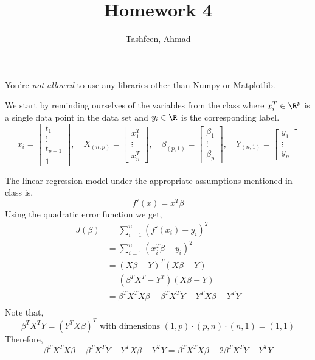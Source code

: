\documentclass{homework}
\author{Tashfeen, Ahmad}
\title{Homework 4}
\begin{document}
 \maketitle
You're \textit{not allowed} to use any libraries other than Numpy or Matplotlib.

We start by reminding ourselves of the variables from the class where $x_i^T \in \R^p$ is a single data point in the data set and $y_i\in \R$ is the corresponding label.
\[
  x_i =
  \begin{bmatrix}
    t_1 \\ \vdots \\ t_{p-1} \\ 1
  \end{bmatrix},
  \quad
  X_{(n, p)} =
  \begin{bmatrix}
    x^T_1 \\ \vdots \\ x^T_n
  \end{bmatrix},
  \quad
  \beta_{(p, 1)} =
  \begin{bmatrix}
    \beta_1 \\ \vdots \\ \beta_p
  \end{bmatrix},
  \quad
  Y_{(n, 1)} =
  \begin{bmatrix}
    y_1 \\ \vdots \\ y_n
  \end{bmatrix}
\]

The linear regression model under the appropriate assumptions mentioned in class is,
\[
  f'(x) = x^T\beta
\]
Using the quadratic error function we get,
\begin{align*}
  J(\beta) & = \sum_{i=1}^n(f'(x_i) - y_{i})^2 \\
           & = \sum_{i=1}^n(x_i^T\beta - y_{i})^2 \\
           & = (X\beta - Y)^T(X\beta - Y) \\
           & = (\beta^TX^T - Y^T)(X\beta - Y) \\
           & = \beta^TX^TX\beta - \beta^TX^TY - Y^TX\beta - Y^TY \\
\end{align*}
Note that,
\[
     \beta^TX^TY = (Y^TX\beta)^T \text{ with dimensions } (1, p) \cdot (p, n) \cdot (n, 1) = (1, 1)
\]
Therefore,
\[
    \beta^TX^TX\beta - \beta^TX^TY - Y^TX\beta - Y^TY = \beta^TX^TX\beta - 2\beta^TX^TY - Y^TY
\]
\end{document}
